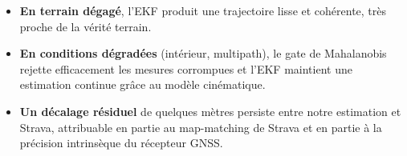 \begin{itemize}
    \item \textbf{En terrain dégagé}, l'EKF produit une trajectoire lisse
    et cohérente, très proche de la vérité terrain.
    \item \textbf{En conditions dégradées} (intérieur, multipath), le gate
    de Mahalanobis rejette efficacement les mesures corrompues et l'EKF
    maintient une estimation continue grâce au modèle cinématique.
    \item \textbf{Un décalage résiduel} de quelques mètres persiste entre
    notre estimation et Strava, attribuable en partie au map-matching de
    Strava et en partie à la précision intrinsèque du récepteur GNSS.
\end{itemize}